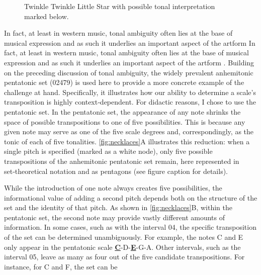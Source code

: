 \documentclass[10pt,twocolumn]{article}
\numberwithin{equation}{section} %
\begin{document}
    \begin{figure}[htbp]
        \centering
        \caption{Twinkle Twinkle Little Star with possible tonal interpretation marked below.}
        \label{fig:twinkle}
    \end{figure}

    In fact, at least in western music, tonal ambiguity often lies at the base of musical expression and as such it underlies an important aspect of the artform In fact, at least in western music, tonal ambiguity often lies at the base of musical expression and as such it underlies an important aspect of the artform \citep{NodenSkinner1984, Richards2017, Smith1992, Temperley2007, Uchida1990}.
    Building on the preceding discussion of tonal ambiguity, the widely prevalent anhemitonic pentatonic set (02479) is used here to provide a more concrete example of the challenge at hand.
    Specifically, it illustrates how our ability to determine a scale's transposition is highly context‑dependent.
    For didactic reasons, I chose to use the pentatonic set.
    In the pentatonic set, the appearance of any note shrinks the space of possible transpositions to one of five possibilities.
    This is because any given note may serve as one of the five scale degrees and, correspondingly, as the tonic of each of five tonalities.
    \autoref{fig:necklaces}A illustrates this reduction: when a single pitch is specified (marked as a white node), only five possible transpositions of the anhemitonic pentatonic set remain, here represented in set‑theoretical notation and as pentagons (see figure caption for details).

    While the introduction of one note always creates five possibilities, the informational value of adding a second pitch depends both on the structure of the set and the identity of that pitch.
    As shown in \autoref{fig:necklaces}B, within the pentatonic set, the second note may provide vastly different amounts of information.
    In some cases, such as with the interval 04, the specific transposition of the set can be determined unambiguously.
    For example, the notes C and E only appear in the pentatonic scale \textbf{\uline{C}}-D-\textbf{\uline{E}}-G-A.
    Other intervals, such as the interval 05, leave as many as four out of the five candidate transpositions.
    For instance, for C and F, the set can be
\end{document}
